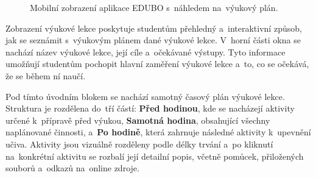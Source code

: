 \documentclass[male,czech,api_bc]{kitheses}
\begin{document}
\begin{figure}[H]
	\centering
	\caption{Mobilní zobrazení aplikace EDUBO s~náhledem na~výukový plán.}
	\label{fig:edubo-7}
\end{figure}

Zobrazení výukové lekce poskytuje studentům přehledný a~interaktivní způsob, jak se seznámit s~výukovým plánem dané výukové lekce. V~horní části okna se nachází název výukové lekce, její cíle a~očekávané výstupy. Tyto informace umožňují studentům pochopit hlavní zaměření výukové lekce a~to, co se očekává, že se během ní naučí.

Pod tímto úvodním blokem se nachází samotný časový plán výukové lekce. Struktura je rozdělena do~tří částí: \textbf{Před hodinou}, kde se nacházejí aktivity určené k~přípravě před výukou, \textbf{Samotná hodina}, obsahující všechny naplánované činnosti, a~\textbf{Po hodině}, která zahrnuje následné aktivity k~upevnění učiva. Aktivity jsou vizuálně rozděleny podle délky trvání a~po kliknutí na~konkrétní aktivitu se rozbalí její detailní popis, včetně pomůcek, přiložených souborů a~odkazů na~online zdroje.
\end{document}
